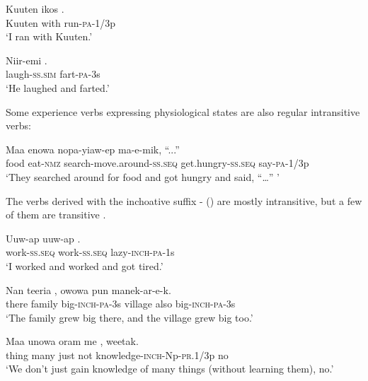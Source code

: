 \ea%
\label{ex:3:x267}
\gll Kuuten ikos . \\
Kuuten with run-\textsc{pa}-1/3p \\
\glt`I ran with Kuuten.'
\z

\ea%
\label{ex:3:x269}
\gll Niir-emi . \\
laugh-\textsc{ss}.\textsc{sim} fart-\textsc{pa}-3s \\
\glt`He laughed and farted.'
\z

Some experience verbs expressing physiological states are also regular intransitive verbs:

\ea%
\label{ex:3:x1485}
\gll Maa enowa nopa-yiaw-ep  ma-e-mik, ``...''\\
food eat-\textsc{nmz} search-move.around-\textsc{ss}.\textsc{seq} get.hungry-\textsc{ss}.\textsc{seq} say-\textsc{pa}-1/3p\\
\glt`They searched around for food and got hungry and said, ``{\dots}'' '
\z

The verbs derived with the inchoative suffix \nobreakdash- () are mostly intransitive, but a few of them are transitive . 

\ea%
\label{ex:3:x271}
\gll Uuw-ap uuw-ap . \\
work-\textsc{ss}.\textsc{seq} work-\textsc{ss}.\textsc{seq} lazy-\textsc{inch}-\textsc{pa}-1s \\
\glt`I worked and worked and got tired.'
\z

\ea%
\label{ex:3:x1486}
\gll Nan teeria , owowa pun manek-ar-e-k. \\
there family big-\textsc{inch}-\textsc{pa}-3s village also big-\textsc{inch}-\textsc{pa}-3s\\
\glt`The family grew big there, and the village grew big too.'
\z

\ea%
\label{ex:3:x1836}
\gll Maa unowa oram me \textstyleEmphasizedVernacularWords{-}\textstyleEmphasizedVernacularWords{-}\textstyleEmphasizedVernacularWords{-}, weetak. \\
thing many just not knowledge-\textsc{inch}-Np-\textsc{pr}.1/3p no\\
\glt`We don't just gain knowledge of many things (without learning them), no.'
\z

